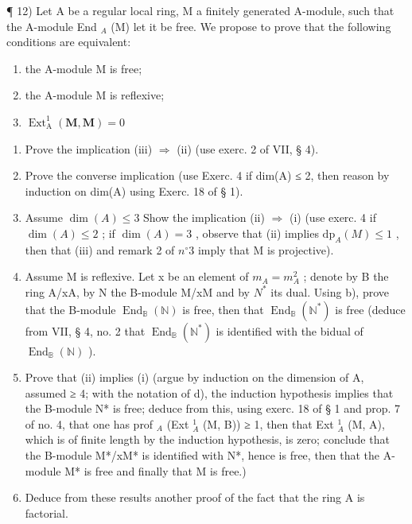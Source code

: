 ¶ 12) Let A be a regular local ring, M a finitely generated A-module, such that the A-module End \(_{A}\) (M) let it be free. We propose to prove that the following conditions are equivalent:

\begin{enumerate}
\def\labelenumi{(\roman{enumi})}
\item
  the A-module M is free;
\item
  the A-module M is reflexive;
\item
  \(\operatorname{Ext}_{\mathrm{A}}^{1}(\mathbf{M},\mathbf{M}) = 0\)
\end{enumerate}

\begin{enumerate}
\def\labelenumi{\alph{enumi})}
\item
  Prove the implication (iii) \(\Rightarrow\) (ii) (use exerc. 2 of VII, § 4).
\item
  Prove the converse implication (use Exerc. 4 if dim(A) ≤ 2, then reason by induction on dim(A) using Exerc. 18 of § 1).
\item
  Assume \(\dim(A) \leqslant 3\) Show the implication (ii) \(\Rightarrow\) (i) (use exerc. 4 if \(\dim(A) \leqslant 2\) ; if \(\dim(A) = 3\) , observe that (ii) implies \(\mathrm{dp}_{A}(M) \leqslant 1\) , then that (iii) and remark 2 of \(n^{\circ} 3\) imply that M is projective).
\item
  Assume M is reflexive. Let x be an element of \(m_{A} = m_{A}^{2}\) ; denote by B the ring A/xA, by N the B-module M/xM and by \(N^{*}\) its dual. Using b), prove that the B-module \(\operatorname{End}_{\mathbb{B}}(\mathbb{N})\) is free, then that \(\operatorname{End}_{\mathbb{B}}(\mathbb{N}^{*})\) is free (deduce from VII, § 4, no. 2 that \(\operatorname{End}_{\mathbb{B}}(\mathbb{N}^{*})\) is identified with the bidual of \(\operatorname{End}_{\mathbb{B}}(\mathbb{N})\) ).
\item
  Prove that (ii) implies (i) (argue by induction on the dimension of A, assumed ≥ 4; with the notation of d), the induction hypothesis implies that the B-module N* is free; deduce from this, using exerc. 18 of § 1 and prop. 7 of no. 4, that one has prof \(_{A}\) (Ext \(^{1}_{A}\) (M, B)) ≥ 1, then that Ext \(^{1}_{A}\) (M, A), which is of finite length by the induction hypothesis, is zero; conclude that the B-module M*/xM* is identified with N*, hence is free, then that the A-module M* is free and finally that M is free.)
\item
  Deduce from these results another proof of the fact that the ring A is factorial.
\end{enumerate}

